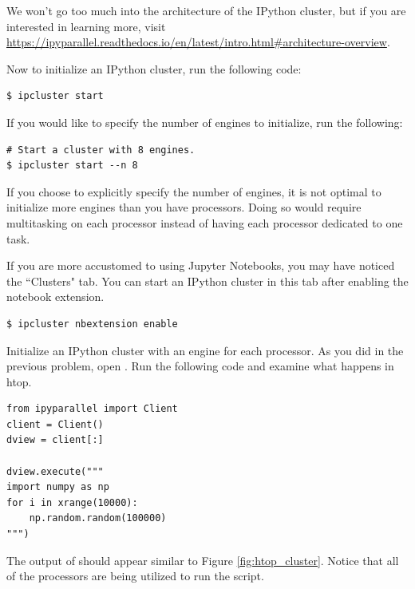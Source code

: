 We won't go too much into the architecture of the IPython cluster, but if you are interested in learning more, visit \url{https://ipyparallel.readthedocs.io/en/latest/intro.html#architecture-overview}.

Now to initialize an IPython cluster, run the following code:

\begin{lstlisting}
$ ipcluster start
\end{lstlisting}


If you would like to specify the number of engines to initialize, run the following:

\begin{lstlisting}
# Start a cluster with 8 engines.
$ ipcluster start --n 8
\end{lstlisting}

If you choose to explicitly specify the number of engines, it is not optimal to initialize more engines than you have processors.
Doing so would require multitasking on each processor instead of having each processor dedicated to one task.

If you are more accustomed to using Jupyter Notebooks, you may have noticed the ``Clusters" tab.
You can start an IPython cluster in this tab after enabling the  notebook extension.

\begin{lstlisting}
$ ipcluster nbextension enable
\end{lstlisting}

\begin{problem}
Initialize an IPython cluster with an engine for each processor. 
As you did in the previous problem, open . 
Run the following code and examine what happens in htop.

\begin{lstlisting}
from ipyparallel import Client
client = Client()
dview = client[:]

dview.execute("""
import numpy as np
for i in xrange(10000):
    np.random.random(100000)
""")
\end{lstlisting}

The output of  should appear similar to Figure \ref{fig:htop_cluster}. 
Notice that all of the processors are being utilized to run the script.
\end{problem}

